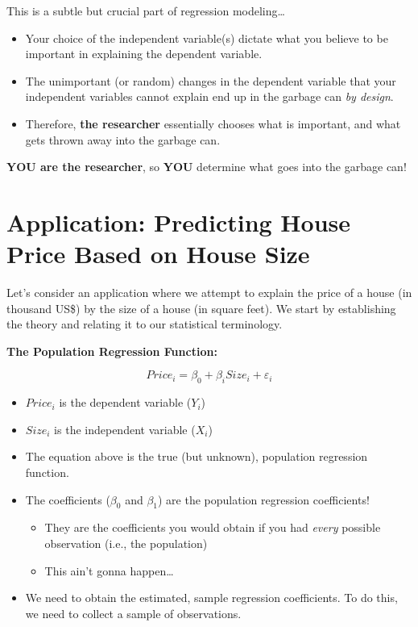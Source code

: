 \documentclass[
]{book}
\begin{document}
This is a subtle but crucial part of regression modeling\ldots{}

\begin{itemize}
\item
  Your choice of the independent variable(s) dictate what you believe to be important in explaining the dependent variable.
\item
  The unimportant (or random) changes in the dependent variable that your independent variables cannot explain end up in the garbage can \emph{by design}.
\item
  Therefore, \textbf{the researcher} essentially chooses what is important, and what gets thrown away into the garbage can.
\end{itemize}

\textbf{YOU are the researcher}, so \textbf{YOU} determine what goes into the garbage can!

\hypertarget{application-predicting-house-price-based-on-house-size}{%
\section{Application: Predicting House Price Based on House Size}\label{application-predicting-house-price-based-on-house-size}}

Let's consider an application where we attempt to explain the price of a house (in thousand US\$) by the size of a house (in square feet). We start by establishing the theory and relating it to our statistical terminology.

\textbf{The Population Regression Function:}

\[Price_i = \beta_0 + \beta_i Size_i + \varepsilon_i\]

\begin{itemize}
\item
  \(Price_i\) is the dependent variable (\(Y_i\))
\item
  \(Size_i\) is the independent variable (\(X_i\))
\item
  The equation above is the true (but unknown), population regression function.
\item
  The coefficients (\(\beta_0\) and \(\beta_1\)) are the population regression coefficients!

  \begin{itemize}
  \item
    They are the coefficients you would obtain if you had \emph{every} possible observation (i.e., the population)
  \item
    This ain't gonna happen\ldots{}
  \end{itemize}
\item
  We need to obtain the estimated, sample regression coefficients. To do this, we need to collect a sample of observations.
\end{itemize}
\end{document}
